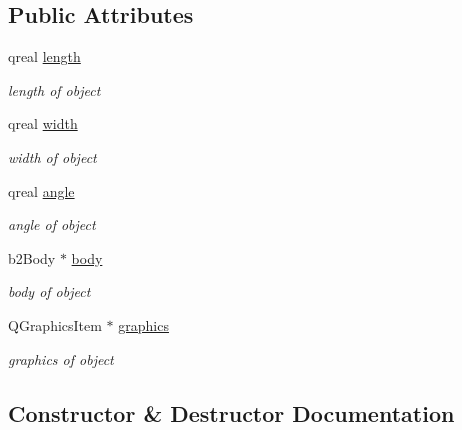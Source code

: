 \subsection*{Public Attributes}
\begin{DoxyCompactItemize}
\item 
qreal \hyperlink{class_trampoline_afc20b8e85af09d551c0278b2dcc1d35d}{length}
\begin{DoxyCompactList}\small\item\em length of object \end{DoxyCompactList}\item 
qreal \hyperlink{class_trampoline_abc6d02536d9caeb1c1d80c545ebae044}{width}
\begin{DoxyCompactList}\small\item\em width of object \end{DoxyCompactList}\item 
qreal \hyperlink{class_trampoline_ae2b2f0ba18c591bbcf360f368758edf7}{angle}
\begin{DoxyCompactList}\small\item\em angle of object \end{DoxyCompactList}\item 
b2\+Body $\ast$ \hyperlink{class_trampoline_a5640097c2fa1b82b69338e3e3d5fc18e}{body}
\begin{DoxyCompactList}\small\item\em body of object \end{DoxyCompactList}\item 
Q\+Graphics\+Item $\ast$ \hyperlink{class_trampoline_a889e4c0143c14b47dc7575395356560a}{graphics}
\begin{DoxyCompactList}\small\item\em graphics of object \end{DoxyCompactList}\end{DoxyCompactItemize}


\subsection{Constructor \& Destructor Documentation}
